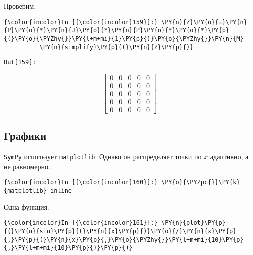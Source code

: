     

    Проверим.

    \begin{Verbatim}[commandchars=\\\{\}]
{\color{incolor}In [{\color{incolor}159}]:} \PY{n}{Z}\PY{o}{=}\PY{n}{P}\PY{o}{*}\PY{n}{J}\PY{o}{*}\PY{n}{P}\PY{o}{*}\PY{o}{*}\PY{p}{(}\PY{o}{\PYZhy{}}\PY{l+m+mi}{1}\PY{p}{)}\PY{o}{\PYZhy{}}\PY{n}{M}
          \PY{n}{simplify}\PY{p}{(}\PY{n}{Z}\PY{p}{)}
\end{Verbatim}
\texttt{\color{outcolor}Out[{\color{outcolor}159}]:}
    
    \[\left[\begin{matrix}0 & 0 & 0 & 0 & 0\\0 & 0 & 0 & 0 & 0\\0 & 0 & 0 & 0 & 0\\0 & 0 & 0 & 0 & 0\\0 & 0 & 0 & 0 & 0\end{matrix}\right]\]

    

\subsection{Графики}
\label{sympy15}

\texttt{SymPy} использует \texttt{matplotlib}. Однако он распределяет
точки по \(x\) адаптивно, а не равномерно.

    \begin{Verbatim}[commandchars=\\\{\}]
{\color{incolor}In [{\color{incolor}160}]:} \PY{o}{\PYZpc{}}\PY{k}{matplotlib} inline
\end{Verbatim}

    Одна функция.

    \begin{Verbatim}[commandchars=\\\{\}]
{\color{incolor}In [{\color{incolor}161}]:} \PY{n}{plot}\PY{p}{(}\PY{n}{sin}\PY{p}{(}\PY{n}{x}\PY{p}{)}\PY{o}{/}\PY{n}{x}\PY{p}{,}\PY{p}{(}\PY{n}{x}\PY{p}{,}\PY{o}{\PYZhy{}}\PY{l+m+mi}{10}\PY{p}{,}\PY{l+m+mi}{10}\PY{p}{)}\PY{p}{)}
\end{Verbatim}

    \begin{center}
    \end{center}
    { \hspace*{\fill} \\}
    
